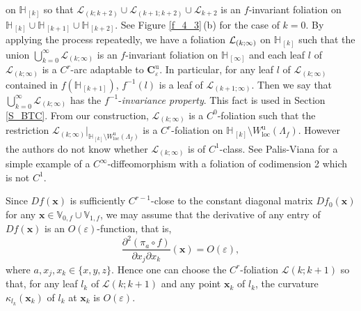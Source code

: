 \documentclass{amsart}
\theoremstyle{definition}
\numberwithin{equation}{section}
\numberwithin{figure}{section}
\begin{document}
on $\mathbb{H}_{\,[k]}$ so that $\mathcal{L}_{(k;k+2)}\cup \mathcal{L}_{(k+1;k+2)}\cup \mathcal{L}_{k+2}$ is an $f$-invariant foliation 
on $\mathbb{H}_{\,[k]}\cup \mathbb{H}_{\,[k+1]}\cup \mathbb{H}_{\,[k+2]}$.
See Figure \ref{f_4_3}\,(b)  for the case of $k=0$.
By applying the process repeatedly, we have a foliation $\mathcal{L}_{(k;\infty)}\index{Lkinf@$\mathcal{L}_{(k;\infty)}$}$ on $\mathbb{H}_{\,[k]}$ 
such that the union $\bigcup_{k=0}^\infty\mathcal{L}_{(k;\infty)}$ is an $f$-invariant foliation on $\mathbb{H}_{\,[\infty]}$ 
and each leaf $l$ of $\mathcal{L}_{(k;\infty)}$ is a $C^r$-arc adaptable to $\boldsymbol{C}_{\varepsilon}^{\mathrm{u}}$.
In particular, for any leaf $l$ of $\mathcal{L}_{(k;\infty)}$ contained in $f(\mathbb{H}_{\,[k+1]})$, 
$f^{-1}(l)$ is a leaf of $\mathcal{L}_{(k+1;\infty)}$.
Then we say that $\bigcup_{k=0}^\infty\mathcal{L}_{(k;\infty)}$ has the $f^{-1}$-\emph{invariance property}. 
This fact is used in Section \ref{S_BTC}.
From our construction, $\mathcal{L}_{(k;\infty)}$ is a $C^0$-foliation such that 
the restriction 
$\mathcal{L}_{(k;\infty)}|_{\mathbb{H}_{\,[k]}\setminus W_{\mathrm{loc}}^{\mathrm{u}}(\Lambda_f)}$ is a $C^r$-foliation on 
$\mathbb{H}_{\,[k]}\setminus W_{\mathrm{loc}}^{\mathrm{u}}(\Lambda_f)$.
However the authors do not know whether $\mathcal{L}_{(k;\infty)}$ is of $C^1$-class.
See Palis-Viana \cite[Example 3.1]{PV94} for a simple example of a $C^\infty$-diffeomorphism 
with a foliation of codimension 2 which is not $C^1$.




Since $Df(\boldsymbol{x})$ is sufficiently $C^{r-1}$-close to the constant diagonal matrix $Df_0(\boldsymbol{x})$ for any 
$\boldsymbol{x}\in \mathbb{V}_{0,f}\cup \mathbb{V}_{1,f}$, we may assume that the derivative  
of any entry of $Df(\boldsymbol{x})$ is an $O(\varepsilon)$-function, that is,
\begin{equation}\label{eqn_DDf}
\dfrac{\partial^2 (\pi_a\circ f)}{\partial x_j\partial x_k}
(\boldsymbol{x})=O(\varepsilon),
\end{equation}
where $a,x_j,x_k\in \{x,y,z\}$.
Hence one can choose the $C^r$-foliation $\mathcal{L}(k;k+1)$ so that, for any leaf 
$l_k$ of $\mathcal{L}(k;k+1)$ and any point $\boldsymbol{x}_k$ of $l_k$, 
the curvature $\kappa_{l_k}(\boldsymbol{x}_k)$ of $l_k$ at $\boldsymbol{x}_k$ is $O(\varepsilon)$.
\end{document}

